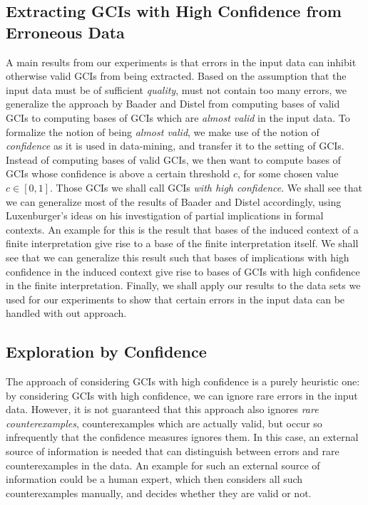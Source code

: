 \subsection{Extracting GCIs with High Confidence from Erroneous Data}
\label{sec:extracting-gcis-from}

A main results from our experiments is that errors in the input data can inhibit otherwise
valid GCIs from being extracted.  Based on the assumption that the input data must be of
sufficient \emph{quality}, \ie must not contain too many errors, we generalize the
approach by Baader and Distel from computing bases of valid GCIs to computing bases of
GCIs which are \emph{almost valid} in the input data.  To formalize the notion of being
\emph{almost valid}, we make use of the notion of \emph{confidence} as it is used in
data-mining, and transfer it to the setting of GCIs.  Instead of computing bases of valid
GCIs, we then want to compute bases of GCIs whose confidence is above a certain threshold
$c$, for some chosen value $c \in [0,1]$.  Those GCIs we shall call GCIs \emph{with high
  confidence}.  We shall see that we can generalize most of the results of Baader and
Distel accordingly, using Luxenburger's ideas on his investigation of partial implications
in formal contexts.  An example for this is the result that bases of the induced context
of a finite interpretation give rise to a base of the finite interpretation itself.  We
shall see that we can generalize this result such that bases of implications with high
confidence in the induced context give rise to bases of GCIs with high confidence in the
finite interpretation.  Finally, we shall apply our results to the data sets we used for
our experiments to show that certain errors in the input data can be handled with out
approach.

\subsection{Exploration by Confidence}
\label{sec:expl-conf-2}

The approach of considering GCIs with high confidence is a purely heuristic one: by
considering GCIs with high confidence, we can ignore rare errors in the input data.
However, it is not guaranteed that this approach also ignores \emph{rare counterexamples},
\ie counterexamples which are actually valid, but occur so infrequently that the
confidence measures ignores them.  In this case, an external source of information is
needed that can distinguish between errors and rare counterexamples in the data.  An
example for such an external source of information could be a human expert, which then
considers all such counterexamples manually, and decides whether they are valid or not.

